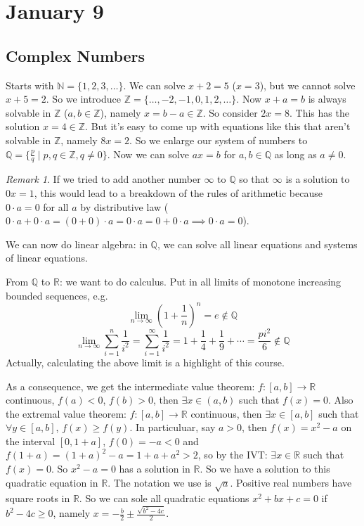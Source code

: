 \documentclass{article}
\theoremstyle{plain}
\theoremstyle{remark}
\newtheorem{remark}{Remark}
\newcommand{\N}{{\mathbb N}}
\newcommand{\Z}{{\mathbb Z}}
\newcommand{\Q}{{\mathbb Q}}
\newcommand{\R}{{\mathbb R}}
\begin{document}
\section{January 9}
\subsection{Complex Numbers}
Starts with $\N = \{1, 2, 3, \dots\}$.
We can solve $x + 2 = 5$ ($x = 3$), but we cannot solve $x + 5 = 2$.
So we introduce $\Z = \{ \dots, -2 , -1, 0 , 1 , 2, \dots\}$.
Now $x + a = b$ is always solvable in $\Z$ ($a,b \in \Z$), namely $x = b - a \in \Z$.
So consider $2x = 8$. This has the solution $x = 4 \in \Z$.
But it's easy to come up with equations like this that aren't solvable in $\Z$,
namely $8x = 2$.
So we enlarge our system of numbers to $\Q = \{\frac{p}{q} \mid p,q \in \Z, q \neq 0\}$.
Now we can solve $ax=b$ for $a,b \in \Q$ as long as $a \neq 0$.
\begin{remark}
	If we tried to add another number $\infty$ to $\Q$
	so that $\infty$ is a solution to $0x = 1$,
	this would lead to a breakdown of the rules of arithmetic because
	$0 \cdot a = 0$ for all $a$ by distributive law
	($0 \cdot a + 0 \cdot a = (0 + 0)\cdot a = 0\cdot a = 0 + 0\cdot a \implies 0\cdot a = 0$).
\end{remark}
We can now do linear algebra: in $\Q$, we can solve all linear equations and systems of linear equations.

From $\Q$ to $\R$: we want to do calculus.
Put in all limits of monotone increasing bounded sequences, e.g.
\[
	\lim_{n\to\infty} (1 + \frac{1}{n})^n = e \not\in \Q
\]
\[
	\lim_{n\to\infty} \sum_{i=1}^n \frac{1}{i^2}
	= \sum_{i=1}^\infty \frac{1}{i^2} = 1 + \frac{1}{4} + \frac{1}{9} + \cdots
	= \frac{pi^2}{6} \not\in \Q
\]
Actually, calculating the above limit is a highlight of this course.

As a consequence, we get the intermediate value theorem:
$f \colon [a,b] \to \R$ continuous, $f(a) < 0$, $f(b) > 0$,
then $\exists x \in (a,b)$ such that $f(x) = 0$.
Also the extremal value theorem:
$f \colon [a,b] \to \R$ continuous, then $\exists x \in [a,b]$ such that
$\forall y \in [a,b]$, $f(x) \geq f(y)$.
In particuluar, say $a > 0$, then $f(x) = x^2 - a$ on the interval $[0,1+a]$,
$f(0) = -a < 0$ and $f(1+a) = (1+a)^2 - a = 1+ a + a^2 > 2$,
so by the IVT: $\exists x \in \R$ such that $f(x) = 0$.
So $x^2 - a = 0$ has a solution in $\R$.
So we have a solution to this quadratic equation in $\R$.
The notation we use is $\sqrt{a}$.
Positive real numbers have square roots in $\R$.
So we can sole all quadratic equations $x^2 + bx + c = 0$ if $b^2 - 4c \geq 0$,
namely $x = -\frac{b}{2} \pm \frac{\sqrt{b^2 - 4c}}{2}$.
\end{document}
